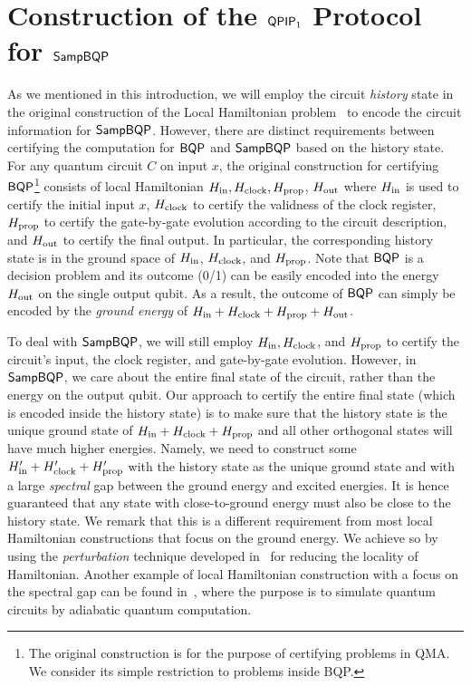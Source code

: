 \section{Construction of the $\operatorname{\mathsf{QPIP}}_1$ Protocol for $\operatorname{\mathsf{SampBQP}}$}
\label{sec:sampbqp_short}

As we mentioned in this introduction, we will employ the circuit \emph{history} state in the original construction of the Local Hamiltonian problem~\cite{kitaev2002classical} to encode the circuit information for $\operatorname{\mathsf{SampBQP}}$.
However, there are distinct requirements between certifying the computation for $\operatorname{\mathsf{BQP}}$ and $\operatorname{\mathsf{SampBQP}}$ based on the history state.
For any quantum circuit $C$ on input $x$, the original construction for certifying $\operatorname{\mathsf{BQP}}$\footnote{The original construction is for the purpose of certifying problems in QMA. We consider its simple restriction to problems inside BQP.} consists of local Hamiltonian $H_{\mathrm{in}}, H_{\mathrm{clock}}, H_{\mathrm{prop}}$, $H_{\mathrm{out}}$ where $H_{\mathrm{in}}$ is used to certify the initial input $x$, $H_{\mathrm{clock}}$ to certify the validness of the clock register,  $H_{\mathrm{prop}}$ to certify the gate-by-gate evolution according to the circuit description, and $H_{\mathrm{out}}$ to certify the final output.
In particular, the corresponding history state is in the ground space of $H_{\mathrm{in}}$, $H_{\mathrm{clock}}$, and $H_{\mathrm{prop}}$. Note that $\operatorname{\mathsf{BQP}}$ is a decision problem and its outcome (0/1) can be easily encoded into the energy $H_{\mathrm{out}}$ on the single output qubit.
As a result, the outcome of $\operatorname{\mathsf{BQP}}$ can simply be encoded by the \emph{ground energy} of $H_{\mathrm{in}} + H_{\mathrm{clock}}+H_{\mathrm{prop}} + H_{\mathrm{out}}$.

To deal with $\operatorname{\mathsf{SampBQP}}$, we will still employ $H_{\mathrm{in}}, H_{\mathrm{clock}}$, and $H_{\mathrm{prop}}$ to certify the circuit's input, the clock register, and gate-by-gate evolution. However, in $\operatorname{\mathsf{SampBQP}}$, we care about the entire final state of the circuit, rather than the energy on the output qubit.
Our approach to certify the entire final state (which is encoded inside the history state) is to make sure that the history state is the unique ground state of $H_{\mathrm{in}} + H_{\mathrm{clock}}+ H_{\mathrm{prop}}$ and all other orthogonal states will have much higher energies.
Namely, we need to construct some $H_{\mathrm{in}}'+ H_{\mathrm{clock}}'+ H_{\mathrm{prop}}'$ with the history state as the unique ground state and with a large \emph{spectral} gap between the ground energy and excited energies.
It is hence guaranteed that any state with close-to-ground energy must also be close to the history state.
We remark that this is a different requirement from most local Hamiltonian constructions that focus on the ground energy.
We achieve so by using the \emph{perturbation} technique developed in~\cite{kempe_kitaev_regev_2006} for reducing the locality of Hamiltonian.
Another example of local Hamiltonian construction with a focus on the spectral gap can be found in~\cite{adiabatic}, where the purpose is to simulate quantum circuits by adiabatic quantum computation.

